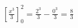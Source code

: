 \documentclass[preview]{standalone}
\begin{document}
\begin{align*}
\left[\frac{x^3}{3}\right]_0^2 = \frac{2^3}{3} - \frac{0^3}{3} = \frac{8}{3}
\end{align*}
\end{document}
